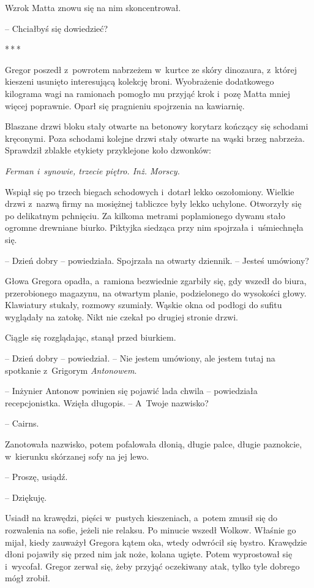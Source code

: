 \documentclass[oneside,polish,12pt,sfheadings]{mwbk}
\newcommand{\threeast}{\bigskip\par\centerline{*\,*\,*}\medskip\par}%
\begin{document}
Wzrok Matta znowu się na nim skoncentrował.

-- Chciałbyś się dowiedzieć?

\threeast

Gregor poszedł z~powrotem nabrzeżem w~kurtce ze skóry dinozaura, z~której kieszeni usunięto interesującą kolekcję broni. Wyobrażenie
dodatkowego kilograma wagi na ramionach pomogło mu przyjąć krok i~pozę
Matta mniej więcej poprawnie. Oparł się pragnieniu spojrzenia na
kawiarnię.

Blaszane drzwi bloku stały otwarte na betonowy korytarz kończący się
schodami kręconymi. Poza schodami kolejne drzwi stały otwarte na wąski
brzeg nabrzeża. Sprawdził zblakłe etykiety przyklejone koło dzwonków:

\emph{Ferman i~synowie, trzecie piętro. Inż. Morscy.}

Wspiął się po trzech biegach schodowych i~dotarł lekko oszołomiony.
Wielkie drzwi z~nazwą firmy na mosiężnej tabliczce były lekko uchylone.
Otworzyły się po delikatnym pchnięciu. Za kilkoma metrami poplamionego
dywanu stało ogromne drewniane biurko. Piktyjka siedząca przy nim
spojrzała i~uśmiechnęła się.

-- Dzień dobry -- powiedziała. Spojrzała na otwarty dziennik. -- Jesteś
umówiony?

Głowa Gregora opadła, a~ramiona bezwiednie zgarbiły się, gdy wszedł do
biura, przerobionego magazynu, na otwartym planie, podzielonego do
wysokości głowy. Klawiatury stukały, rozmowy szumiały. Wąskie okna od
podłogi do sufitu wyglądały na zatokę. Nikt nie czekał po drugiej
stronie drzwi.

Ciągle się rozglądając, stanął przed biurkiem.

-- Dzień dobry -- powiedział. -- Nie jestem umówiony, ale jestem tutaj na
spotkanie z~Grigorym \emph{Antonowem}.

-- Inżynier Antonow powinien się pojawić lada chwila -- powiedziała
recepcjonistka. Wzięła długopis. -- A~Twoje nazwisko?

-- Cairns.

Zanotowała nazwisko, potem pofalowała dłonią, długie palce, długie
paznokcie, w~kierunku skórzanej sofy na jej lewo.

-- Proszę, usiądź.

-- Dziękuję.

Usiadł na krawędzi, pięści w~pustych kieszeniach, a~potem zmusił się do
rozwalenia na sofie, jeżeli nie relaksu. Po minucie wszedł Wolkow.
Właśnie go mijał, kiedy zauważył Gregora kątem oka, wtedy odwrócił się
bystro. Krawędzie dłoni pojawiły się przed nim jak noże, kolana ugięte.
Potem wyprostował się i~wycofał. Gregor zerwał się, żeby przyjąć
oczekiwany atak, tylko tyle dobrego mógł zrobił.
\end{document}
